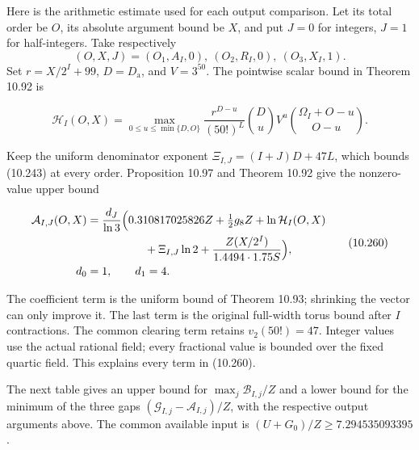 \documentclass[
  11pt,
  a4paper,
]{article}
\begin{document}
Here is the arithmetic estimate used for each output comparison. Let its
total order be \(O\), its absolute argument bound be \(X\), and put
\(J=0\) for integers, \(J=1\) for half-integers. Take respectively \[
(O,X,J)=(O_1,A_I,0),\ (O_2,R_I,0),\ (O_3,X_I,1).
\] Set \(r=X/2^I+99\), \(D=D_{\mathrm a}\), and \(V=3^{50}\). The
pointwise scalar bound in Theorem 10.92 is

\[
\mathcal H_I(O,X)=\max_{0\le u\le\min\{D,O\}}
\frac{r^{D-u}}{(50!)^L}\binom Du V^u
\binom{\Omega_I+O-u}{O-u}.
\tag{10.259}
\]

Keep the uniform denominator exponent \(\Xi_{I,J}=(I+J)D+47L\), which
bounds (10.243) at every order. Proposition 10.97 and Theorem 10.92 give
the nonzero-value upper bound

\[
\begin{aligned}
\mathcal A_{I,J}(O,X)
&=\frac{d_J}{\ln3}\Bigl(
0.310817025826Z+\tfrac12g_8Z+\ln\mathcal H_I(O,X)\\
&\hspace{18mm}+\Xi_{I,J}\ln2+
\frac{Z(X/2^I)}{1.4494\cdot1.75S}\Bigr),\\
d_0&=1,\qquad d_1=4.
\end{aligned}
\tag{10.260}
\]

The coefficient term is the uniform bound of Theorem 10.93; shrinking
the vector can only improve it. The last term is the original full-width
torus bound after \(I\) contractions. The common clearing term retains
\(v_2(50!)=47\). Integer values use the actual rational field; every
fractional value is bounded over the fixed quartic field. This explains
every term in (10.260).

The next table gives an upper bound for \(\max_j\mathcal B_{I,j}/Z\) and
a lower bound for the minimum of the three gaps
\((\mathcal G_{I,j}-\mathcal A_{I,j})/Z\), with the respective output
arguments above. The common available input is
\((U+G_0)/Z\ge7.294535093395\).
\end{document}
